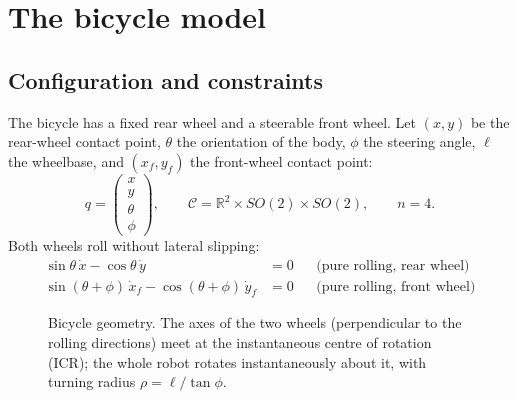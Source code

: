 \documentclass[11pt,a4paper]{article}
\newcommand{\R}{\mathbb{R}}
\newcommand{\wheel}[3]{\begin{scope}[shift={#1},rotate=#2]
  \draw[fill=#3,rounded corners=1pt] (-0.4,-0.12) rectangle (0.4,0.12);\end{scope}}
\theoremstyle{definition}
\theoremstyle{plain}
\theoremstyle{remark}
\begin{document}
\section{The bicycle model}

\subsection{Configuration and constraints}

The bicycle has a fixed rear wheel and a steerable front wheel. Let $(x,y)$ be the rear-wheel contact point, $\theta$ the orientation of the body, $\phi$ the steering angle, $\ell$ the wheelbase, and $(x_f,y_f)$ the front-wheel contact point:
\[
q=\begin{pmatrix}x\\y\\\theta\\\phi\end{pmatrix},\qquad
\mathcal C=\R^2\times SO(2)\times SO(2),\qquad n=4 .
\]
Both wheels roll without lateral slipping:
\begin{align}
\sin\theta\,\dot x-\cos\theta\,\dot y&=0 &&\text{(pure rolling, rear wheel)}\tag{R}\\
\sin(\theta+\phi)\,\dot x_f-\cos(\theta+\phi)\,\dot y_f&=0 &&\text{(pure rolling, front wheel)}\tag{F}
\end{align}

\begin{figure}[H]
\centering
{}
\caption{Bicycle geometry. The axes of the two wheels (perpendicular to the rolling directions) meet at the instantaneous centre of rotation (ICR); the whole robot rotates instantaneously about it, with turning radius $\rho=\ell/\tan\phi$.}
\label{fig:bicycle}
\end{figure}
\end{document}
